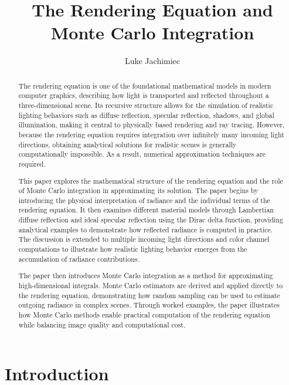 \documentclass[12pt]{article}
\title{The Rendering Equation and Monte Carlo Integration}
\author{Luke Jachimiec}
\date{}
\begin{document}
\maketitle

\begin{abstract}
The rendering equation is one of the foundational mathematical models in modern computer graphics, describing how light is transported and reflected throughout a three-dimensional scene. Its recursive structure allows for the simulation of realistic lighting behaviors such as diffuse reflection, specular reflection, shadows, and global illumination, making it central to physically based rendering and ray tracing. However, because the rendering equation requires integration over infinitely many incoming light directions, obtaining analytical solutions for realistic scenes is generally computationally impossible. As a result, numerical approximation techniques are required.

This paper explores the mathematical structure of the rendering equation and the role of Monte Carlo integration in approximating its solution. The paper begins by introducing the physical interpretation of radiance and the individual terms of the rendering equation. It then examines different material models through Lambertian diffuse reflection and ideal specular reflection using the Dirac delta function, providing analytical examples to demonstrate how reflected radiance is computed in practice. The discussion is extended to multiple incoming light directions and color channel computations to illustrate how realistic lighting behavior emerges from the accumulation of radiance contributions.

The paper then introduces Monte Carlo integration as a method for approximating high-dimensional integrals. Monte Carlo estimators are derived and applied directly to the rendering equation, demonstrating how random sampling can be used to estimate outgoing radiance in complex scenes. Through worked examples, the paper illustrates how Monte Carlo methods enable practical computation of the rendering equation while balancing image quality and computational cost.

\end{abstract}

\section{Introduction}
\end{document}
